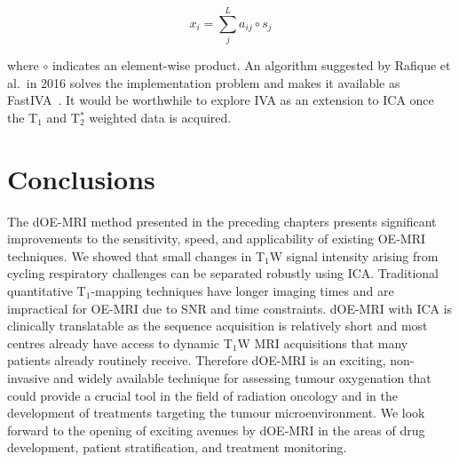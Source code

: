 \begin{equation}
x_i = \sum_{j}^{L} a_{ij} \circ s_j
\end{equation}

where $\circ$ indicates an element-wise product. 
An algorithm suggested by Rafique et al.\ in 2016 solves the implementation problem and makes it available as FastIVA~\cite{Rafique:2016cf}.
It would be worthwhile to explore \acs{IVA} as an extension to \acs{ICA} once the T$_1$ and T$_2^*$ weighted data is acquired.


\section{Conclusions}

The \acs{dOE-MRI} method presented in the preceding chapters presents significant improvements to the sensitivity, speed, and applicability of existing \acs{OE-MRI} techniques. 
We showed that small changes in T$_1$W signal intensity arising from cycling respiratory challenges can be separated robustly using \acs{ICA}. 
Traditional quantitative T$_1$-mapping techniques have longer imaging times and are impractical for \acs{OE-MRI} due to \acs{SNR} and time constraints.
\acs{dOE-MRI} with \acs{ICA} is clinically translatable as the sequence acquisition is relatively short and most centres already have access to dynamic T$_1$W MRI acquisitions that many patients already routinely receive. 
Therefore \acs{dOE-MRI} is an exciting, non-invasive and widely available technique for assessing tumour oxygenation that could provide a crucial tool in the field of radiation oncology and in the development of treatments targeting the tumour microenvironment.
We look forward to the opening of exciting avenues by \acs{dOE-MRI} in the areas of drug development, patient stratification, and treatment monitoring. 


\endinput